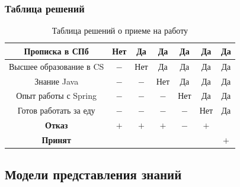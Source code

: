 \subsubsection{Таблица решений}

\begin{table}[H]
	\def\tabcolsep{12pt}
	\caption{Таблица решений о приеме на работу}
	\begin{tabular}{|c|c|c|c|c|c|c|}
	\hline
	Прописка в СПб		  & Нет & Да  & Да  & Да  & Да  & Да  \\ \hline
	Высшее образование в CS & $-$ & Нет & Да  & Да  & Да  & Да  \\ \hline
	Знание Java			 & $-$ & $-$ & Нет & Да  & Да  & Да  \\ \hline
	Опыт работы с Spring	& $-$ & $-$ & $-$ & Нет & Да  & Да  \\ \hline
	Готов работать за еду   & $-$ & $-$ & $-$ & $-$ & Нет & Да  \\ \hline
	\textbf{Отказ}		  & $+$ & $+$ & $+$ & $-$ & $+$ &	 \\ \hline
	\textbf{Принят}		 &	 &	 &	 &	 &	 & $+$ \\ \hline
	\end{tabular}
\end{table}

\subsection{Модели представления знаний}


